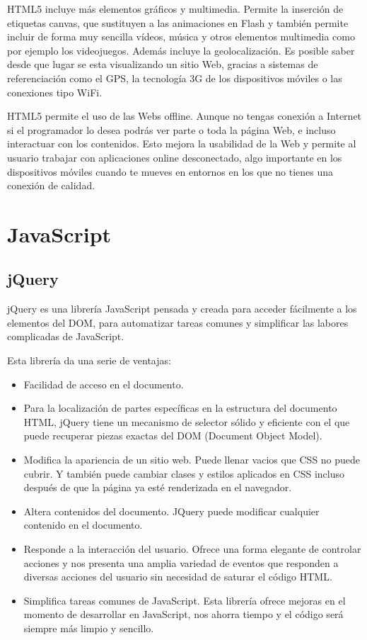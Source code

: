 \documentclass[a4paper, 12pt]{book}
\begin{document}
HTML5 incluye m\'as elementos gr\'aficos y multimedia. Permite la inserci\'on de etiquetas canvas, que sustituyen a las animaciones en Flash y tambi\'en 
permite incluir de forma muy sencilla v\'ideos, m\'usica y otros elementos multimedia como por ejemplo los videojuegos. Adem\'as incluye la 
geolocalizaci\'on. Es posible saber desde que lugar se esta visualizando un sitio Web, gracias a sistemas de referenciaci\'on como el GPS, 
la tecnolog\'ia 3G de los dispositivos m\'oviles o las conexiones tipo WiFi.

HTML5 permite el uso de las Webs offline. Aunque no tengas conexi\'on a Internet si el programador lo desea podr\'as ver parte o toda la p\'agina Web, 
e incluso interactuar con los contenidos. Esto mejora la usabilidad de la Web y permite al usuario trabajar con aplicaciones online desconectado, 
algo importante en los dispositivos m\'oviles cuando te mueves en entornos en los que no tienes una conexi\'on de calidad.


\section{JavaScript}
\label{sec:javascript}


\subsection{jQuery}
\label{subsec:jquery}
jQuery es una librer\'ia JavaScript pensada y creada para acceder f\'acilmente a los elementos del DOM, para automatizar tareas comunes 
y simplificar las labores complicadas de JavaScript.

Esta librer\'ia da una serie de ventajas: 
\begin{itemize}
  \item Facilidad de acceso en el documento.
  \item Para la localizaci\'on de partes espec\'ificas en la estructura del documento HTML, jQuery tiene un mecanismo de selector s\'olido y 
eficiente con el que puede recuperar piezas exactas del DOM (Document Object Model).
  \item Modifica la apariencia de un sitio web. Puede llenar vacios que CSS no puede cubrir. Y tambi\'en puede cambiar clases y estilos aplicados 
en CSS incluso despu\'es de que la p\'agina ya est\'e renderizada en el navegador.
  \item Altera contenidos del documento. JQuery puede modificar cualquier contenido en el documento.
  \item Responde a la interacci\'on del usuario. Ofrece una forma elegante de controlar acciones y nos presenta una amplia variedad de eventos 
que responden a diversas acciones del usuario sin necesidad de saturar el c\'odigo HTML.
  \item Simplifica tareas comunes de JavaScript. Esta librer\'ia ofrece mejoras en el momento de desarrollar en JavaScript, nos ahorra tiempo 
y el c\'odigo ser\'a siempre m\'as limpio y sencillo.
\end{itemize}
\end{document}
